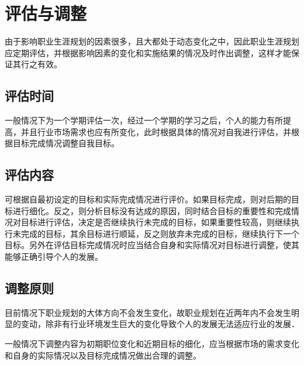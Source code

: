 \documentclass{article}
\begin{document}
\section{评估与调整}
由于影响职业生涯规划的因素很多，且大都处于动态变化之中，因此职业生涯规划应定期评估，并根据影响因素的变化和实施结果的情况及时作出调整，这样才能保证其行之有效。\par 
\subsection{评估时间}
一般情况下为一个学期评估一次，经过一个学期的学习之后，个人的能力有所提高，并且行业市场需求也应有所变化，此时根据具体的情况对自我进行评估，并根据目标完成情况调整自我目标。\par
\subsection{评估内容}
可根据自最初设定的目标和实际完成情况进行评价。如果目标完成，则对后期的目标进行细化。反之，则分析目标没有达成的原因，同时结合目标的重要性和完成情况对目标进行评估，决定是否继续执行未完成的目标，如果重要性较高，则继续执行未完成的目标，其余目标进行顺延，反之则放弃未完成的目标，继续执行下一个目标。另外在评估目标完成情况时应当结合自身和实际情况对目标进行调整，使其能够正确引导个人的发展。
\subsection{调整原则}
目前情况下职业规划的大体方向不会发生变化，故职业规划在近两年内不会发生明显的变动，除非有行业环境发生巨大的变化导致个人的发展无法适应行业的发展．
\par
一般情况下调整内容为初期职位变化和近期目标的细化，应当根据市场的需求变化和自身的实际情况以及目标完成情况做出合理的调整。
\par
\end{document}
